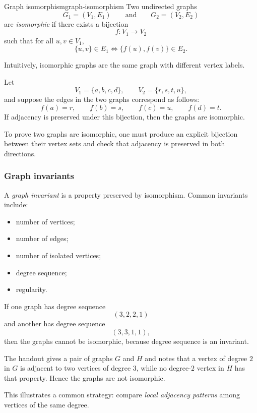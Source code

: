 \begin{definition}{Graph isomorphism}{graph-isomorphism}
Two undirected graphs
\[
G_1=(V_1,E_1)
\qquad\text{and}\qquad
G_2=(V_2,E_2)
\]
are \emph{isomorphic} if there exists a bijection
\[
f:V_1\to V_2
\]
such that for all \(u,v\in V_1\),
\[
\{u,v\}\in E_1
\iff
\{f(u),f(v)\}\in E_2.
\]
\end{definition}

Intuitively, isomorphic graphs are the same graph with different vertex labels.

\begin{examplebox}[title={A concrete isomorphism}]
Let
\[
V_1=\{a,b,c,d\},
\qquad
V_2=\{r,s,t,u\},
\]
and suppose the edges in the two graphs correspond as follows:
\[
f(a)=r,\qquad f(b)=s,\qquad f(c)=u,\qquad f(d)=t.
\]
If adjacency is preserved under this bijection, then the graphs are isomorphic.
\end{examplebox}

\begin{examtip}[title={How to prove two graphs are isomorphic}]
To prove two graphs are isomorphic, one must produce an explicit bijection between their vertex sets and check that adjacency is preserved in both directions.
\end{examtip}

\subsubsection{Graph invariants}

A \emph{graph invariant} is a property preserved by isomorphism. Common invariants include:
\begin{itemize}[leftmargin=*]
    \item number of vertices;
    \item number of edges;
    \item number of isolated vertices;
    \item degree sequence;
    \item regularity.
\end{itemize}

\begin{examplebox}[title={Showing graphs are not isomorphic}]
If one graph has degree sequence
\[
(3,2,2,1)
\]
and another has degree sequence
\[
(3,3,1,1),
\]
then the graphs cannot be isomorphic, because degree sequence is an invariant.
\end{examplebox}

\begin{examplebox}[title={Handout non-isomorphism example}]
The handout gives a pair of graphs \(G\) and \(H\) and notes that a vertex of degree \(2\) in \(G\) is adjacent to two vertices of degree \(3\), while no degree-\(2\) vertex in \(H\) has that property. Hence the graphs are not isomorphic.

This illustrates a common strategy: compare \emph{local adjacency patterns} among vertices of the same degree.
\end{examplebox}

